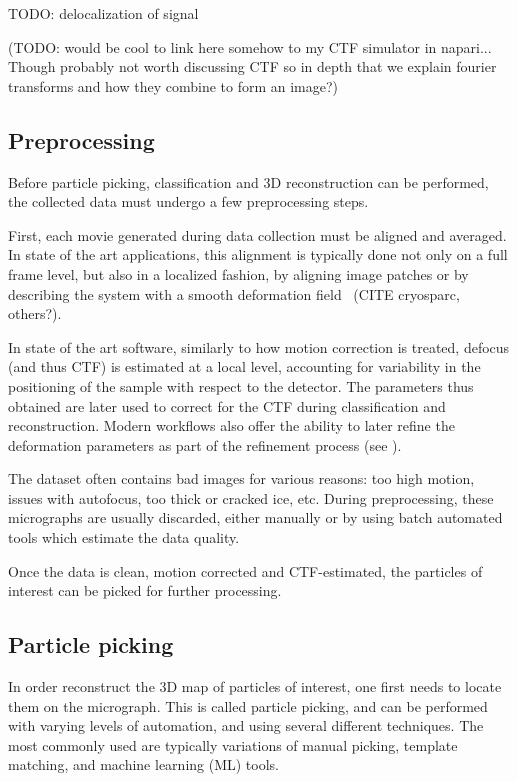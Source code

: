 TODO: delocalization of signal

(TODO: would be cool to link here somehow to my CTF simulator in napari... Though probably not worth discussing CTF so in depth that we explain fourier transforms and how they combine to form an image?)

\subsection{Preprocessing}

Before particle picking, classification and 3D reconstruction can be performed, the collected data must undergo a few preprocessing steps.

First, each movie generated during data collection must be aligned and averaged. In state of the art applications, this alignment is typically done not only on a full frame level, but also in a localized fashion, by aligning image patches or by describing the system with a smooth deformation field~\cite{zhengMotionCor2AnisotropicCorrection2017} (CITE cryosparc, others?).

In state of the art software, similarly to how motion correction is treated, defocus (and thus CTF) is estimated at a local level, accounting for variability in the positioning of the sample with respect to the detector. The parameters thus obtained are later used to correct for the CTF during classification and reconstruction. Modern workflows also offer the ability to later refine the deformation parameters as part of the refinement process (see ).

The dataset often contains bad images for various reasons: too high motion, issues with autofocus, too thick or cracked ice, etc. During preprocessing, these micrographs are usually discarded, either manually or by using batch automated tools which estimate the data quality.

Once the data is clean, motion corrected and CTF-estimated, the particles of interest can be picked for further processing.

\subsection{Particle picking}

In order reconstruct the 3D map of particles of interest, one first needs to locate them on the micrograph. This is called particle picking, and can be performed with varying levels of automation, and using several different techniques. The most commonly used are typically variations of manual picking, template matching, and machine learning (ML) tools.


